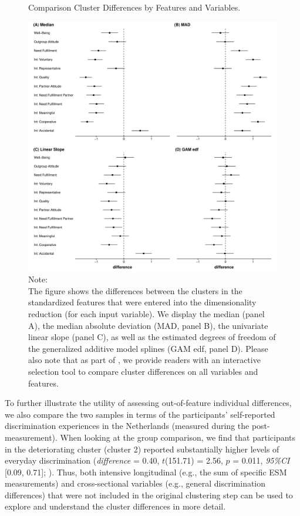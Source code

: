 \begin{figure}[!ht] %
  \caption{Comparison Cluster Differences by Features and Variables.}
  \label{fig:cluster_comparison_features}
  \centering\includegraphics[width=\textwidth]{figures/feature_comparison_combined.pdf}
  \caption*{Note:\\
  The figure shows the differences between the clusters in the standardized features that were entered into the dimensionality reduction (for each input variable). We display the median (panel A), the median absolute deviation (MAD, panel B), the univariate linear slope (panel C), as well as the estimated degrees of freedom of the generalized additive model splines (GAM edf, panel D). Please also note that as part of \situtorial, we provide readers with an interactive selection tool to compare cluster differences on all variables and features.}
\end{figure}

To further illustrate the utility of assessing out-of-feature individual
differences, we also compare the two samples in terms of the
participants' self-reported discrimination experiences in the
Netherlands (measured during the post-measurement). When looking at the
group comparison, we find that participants in the deteriorating cluster
(cluster 2) reported substantially higher levels of everyday
discrimination (\textit{difference} = 0.40, \(t\)(151.71) = 2.56, \(p\)
= 0.011, \textit{95\%CI} {[}0.09, 0.71{]};
). Thus, both intensive longitudinal
(e.g., the sum of specific ESM measurements) and cross-sectional
variables (e.g., general discrimination differences) that were not
included in the original clustering step can be used to explore and
understand the cluster differences in more detail.

